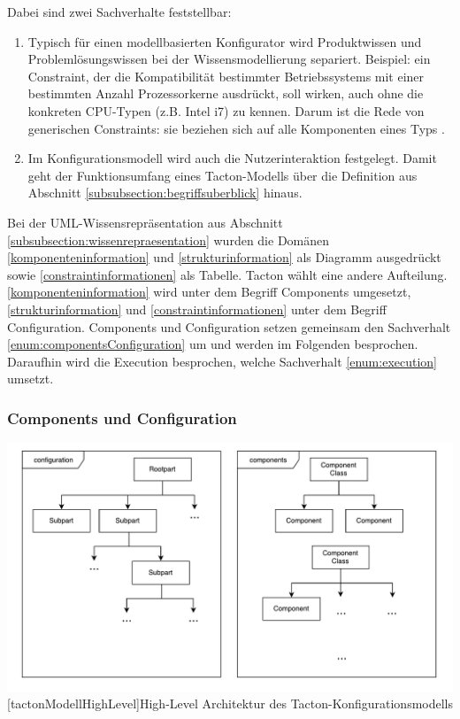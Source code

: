 \documentclass[12pt,a4paper,bibliography=totocnumbered,listof=totoc]{scrartcl}
\begin{document}
Dabei sind zwei Sachverhalte feststellbar:
\begin{enumerate}[(1)]
\item \label{enum:componentsConfiguration} Typisch für einen modellbasierten Konfigurator wird Produktwissen und Problemlösungswissen bei der Wissensmodellierung separiert. Beispiel: ein Constraint, der die Kompatibilität bestimmter Betriebssystems mit einer bestimmten Anzahl Prozessorkerne ausdrückt, soll wirken, auch ohne die konkreten CPU-Typen (z.B. Intel i7) zu kennen. Darum ist die Rede von generischen Constraints: sie beziehen sich auf alle Komponenten eines Typs \citep{felferning14}.
\item \label{enum:execution} Im Konfigurationsmodell wird auch die Nutzerinteraktion festgelegt. Damit geht der Funktionsumfang eines Tacton-Modells über die Definition aus Abschnitt \ref{subsubsection:begriffsuberblick} hinaus.
\end{enumerate}

Bei der UML-Wissensrepräsentation aus Abschnitt \ref{subsubsection:wissenrepraesentation} wurden die Domänen \eqref{komponenteninformation} und \eqref{strukturinformation} als Diagramm ausgedrückt sowie \eqref{constraintinformationen} als Tabelle. Tacton wählt eine andere Aufteilung. \eqref{komponenteninformation} wird unter dem Begriff \glqq Components\grqq{} umgesetzt, \eqref{strukturinformation} und \eqref{constraintinformationen} unter dem Begriff \glqq Configuration\grqq{}. Components und Configuration setzen gemeinsam den Sachverhalt \eqref{enum:componentsConfiguration} um und werden im Folgenden besprochen. Daraufhin wird die \glqq Execution\grqq{} besprochen, welche Sachverhalt \eqref{enum:execution} umsetzt.


\subsubsection{Components und Configuration}

\vspace{1em}
\begin{minipage}{\linewidth}
	\centering
	\includegraphics[width=1\linewidth]{Abbildungen/tactonModellHighLevel.pdf}
	[tactonModellHighLevel]{High-Level Architektur des Tacton-Konfigurationsmodells}
	\label{fig:tactonModellHighLevel}
\end{minipage}
\vspace{1em}
\end{document}
